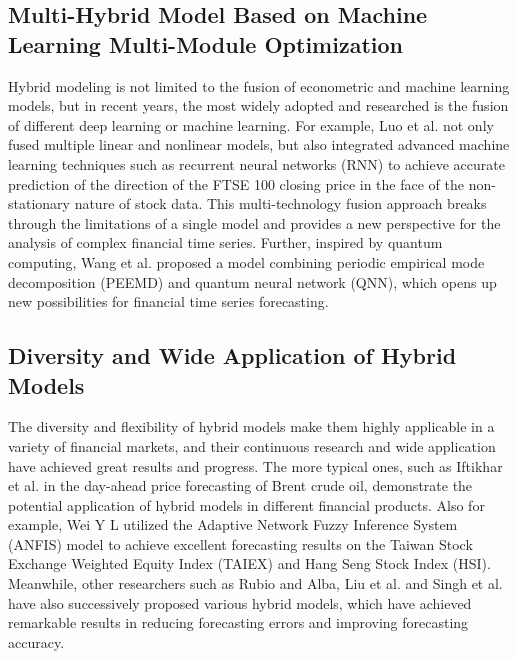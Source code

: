 \documentclass[sn-mathphys,Numbered]{sn-jnl}
\theoremstyle{thmstyleone}%
\theoremstyle{thmstyletwo}%
\theoremstyle{thmstylethree}%
\begin{document}
\subsection{Multi-Hybrid Model Based on Machine Learning Multi-Module Optimization}\label{sec2.2}

Hybrid modeling is not limited to the fusion of econometric and machine learning models, but in recent years, the most widely adopted and researched is the fusion of different deep learning or machine learning. For example, Luo et al. not only fused multiple linear and nonlinear models, but also integrated advanced machine learning techniques such as recurrent neural networks (RNN) to achieve accurate prediction of the direction of the FTSE 100 closing price in the face of the non-stationary nature of stock data. \cite{luo2021hybrid}This multi-technology fusion approach breaks through the limitations of a single model and provides a new perspective for the analysis of complex financial time series. Further, inspired by quantum computing, Wang et al. proposed a model \cite{du2019container} combining periodic empirical mode decomposition (PEEMD) and quantum neural network (QNN), which opens up new possibilities for financial time series forecasting.

\subsection{Diversity and Wide Application of Hybrid Models}\label{sec2.3}

The diversity and flexibility of hybrid models make them highly applicable in a variety of financial markets, and their continuous research and wide application have achieved great results and progress. The more typical ones, such as Iftikhar et al. in the day-ahead price forecasting of Brent crude oil, demonstrate the potential application of hybrid models in different financial products\cite{iftikhar2023forecasting}. Also for example, Wei Y L utilized the Adaptive Network Fuzzy Inference System (ANFIS) model to achieve excellent forecasting results on the Taiwan Stock Exchange Weighted Equity Index (TAIEX) and Hang Seng Stock Index (HSI)\cite{wei2016hybrid}. Meanwhile, other researchers such as Rubio and Alba\cite{rubio2022forecasting}, Liu et al.\cite{li2020fractional} and Singh et al.\cite{singh2021soft} have also successively proposed various hybrid models, which have achieved remarkable results in reducing forecasting errors and improving forecasting accuracy.
\end{document}
